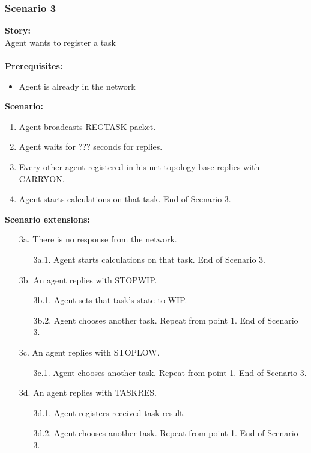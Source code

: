 \documentclass{article}
\begin{document}
\subsubsection{Scenario 3}
\noindent\textbf{Story:} \\
Agent wants to register a task \\\\
\textbf{Prerequisites:}
\begin{itemize}
    \item Agent is already in the network
\end{itemize}
\textbf{Scenario:}
\begin{enumerate}
    \item Agent broadcasts REGTASK packet.
    \item Agent waits for ??? seconds for replies.
    \item Every other agent registered in his net topology base replies with CARRYON.
    \item Agent starts calculations on that task. End of Scenario 3.
\end{enumerate}
\textbf{Scenario extensions:}
\begin{itemize}
    \item[3a.] There is no response from the network.  
    \begin{itemize} 
    \item[3a.1.] Agent starts calculations on that task. End of Scenario 3.
    \end{itemize}
    \item[3b.] An agent replies with STOPWIP.
    \begin{itemize} 
    \item[3b.1.] Agent sets that task's state to WIP.
    \item[3b.2.] Agent chooses another task. Repeat from point 1. End of Scenario 3.  
    \end{itemize}
    \item[3c.] An agent replies with STOPLOW.  
    \begin{itemize} 
    \item[3c.1.] Agent chooses another task. Repeat from point 1. End of Scenario 3.  
    \end{itemize}
    \item[3d.] An agent replies with TASKRES. 
    \begin{itemize} 
    \item[3d.1.] Agent registers received task result. 
    \item[3d.2.] Agent chooses another task. Repeat from point 1. End of Scenario 3.  
    \end{itemize}
\end{itemize}
\end{document}
